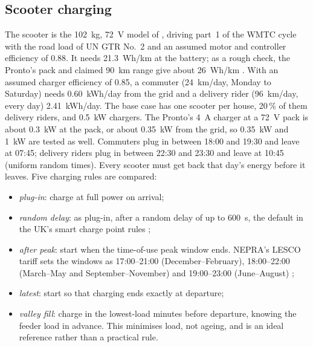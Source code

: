 \documentclass[conference]{IEEEtran}
\begin{document}
\subsection{Scooter charging}
The scooter is the 102~kg, 72~V model of \cite{gillani2}, driving part~1 of
the WMTC cycle with the road load of UN GTR No.~2 and an assumed motor and
controller efficiency of 0.88. It needs 21.3~Wh/km at the battery; as a rough
check, the Pronto's pack and claimed 90~km range give about 26~Wh/km
\cite{pronto}. With an assumed charger efficiency of 0.85, a commuter
(24~km/day, Monday to Saturday) needs 0.60~kWh/day from the grid and a
delivery rider (96~km/day, every day) 2.41~kWh/day. The base case has one
scooter per house, 20\,\% of them delivery riders, and 0.5~kW chargers. The
Pronto's 4~A charger at a 72~V pack is about 0.3~kW at the pack, or about
0.35~kW from the grid, so 0.35~kW and 1~kW are tested as well. Commuters plug
in between 18:00 and 19:30 and leave at 07:45; delivery riders plug in
between 22:30 and 23:30 and leave at 10:45 (uniform random times). Every
scooter must get back that day's energy before it leaves. Five charging rules
are compared:
\begin{itemize}
\item \emph{plug-in}: charge at full power on arrival;
\item \emph{random delay}: as plug-in, after a random delay of up to 600~s,
the default in the UK's smart charge point rules \cite{ukscp};
\item \emph{after peak}: start when the time-of-use peak window ends. NEPRA's
LESCO tariff sets the windows as 17:00--21:00 (December--February),
18:00--22:00 (March--May and September--November) and 19:00--23:00
(June--August) \cite{nepra2026};
\item \emph{latest}: start so that charging ends exactly at departure;
\item \emph{valley fill}: charge in the lowest-load minutes before departure,
knowing the feeder load in advance. This minimises load, not ageing, and is
an ideal reference rather than a practical rule.
\end{itemize}
\end{document}
